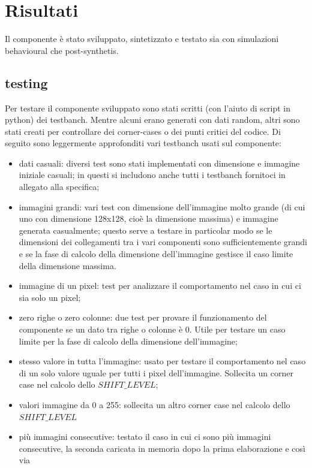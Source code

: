 \documentclass[11pt]{article} %
\begin{document}
\section{Risultati}
Il componente è stato sviluppato, sintetizzato e testato sia con simulazioni behavioural che post-synthetis.

\subsection{testing}
Per testare il componente sviluppato sono stati scritti (con l'aiuto di script in python) dei testbanch. Mentre alcuni erano generati con dati random, altri sono stati creati per controllare dei corner-cases o dei punti critici del codice. Di seguito sono leggermente approfonditi vari testbanch usati sul componente:

\begin{itemize}
\item dati casuali: diversi test sono stati implementati con dimensione e immagine iniziale casuali; in questi si includono anche tutti i testbanch fornitoci in allegato alla specifica;
\item immagini grandi: vari test con dimensione dell'immagine molto grande (di cui uno con dimensione 128x128, cioè la dimensione massima) e immagine generata casualmente; questo serve a testare in particolar modo se le dimensioni dei collegamenti tra i vari componenti sono sufficientemente grandi e se la fase di calcolo della dimensione dell'immagine gestisce il caso limite della dimensione massima.
\item immagine di un pixel: test per analizzare il comportamento nel caso in cui ci sia solo un pixel;
\item zero righe o zero colonne: due test per provare il funzionamento del componente se un dato tra righe o colonne è 0. Utile per testare un caso limite per la fase di calcolo della dimensione dell'immagine;
\item stesso valore in tutta l'immagine: usato per testare il comportamento nel caso di un solo valore uguale per tutti i pixel dell'immagine. Sollecita un corner case nel calcolo dello $SHIFT\_LEVEL$;
\item valori immagine da 0 a 255: sollecita un altro corner case nel calcolo dello $SHIFT\_LEVEL$
\item più immagini consecutive: testato il caso in cui ci sono più immagini consecutive, la seconda caricata in memoria dopo la prima elaborazione e così via
\end{itemize}
\end{document}
